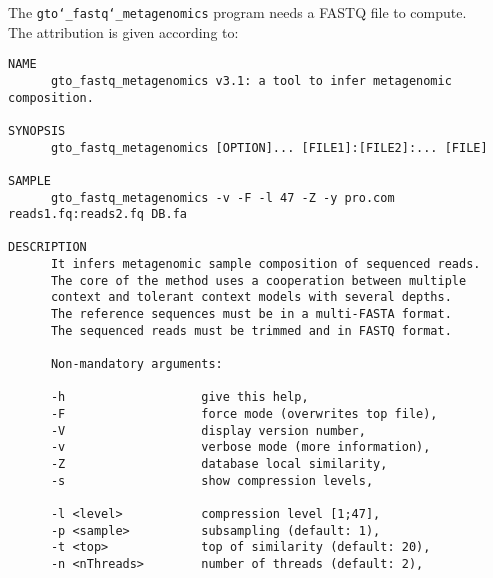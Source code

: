 The \texttt{gto\char`_fastq\char`_metagenomics} program needs a FASTQ file to compute.\\
The attribution is given according to:
\begin{lstlisting}
NAME                                                                     
      gto_fastq_metagenomics v3.1: a tool to infer metagenomic composition.            
                                                                         
SYNOPSIS                                                                 
      gto_fastq_metagenomics [OPTION]... [FILE1]:[FILE2]:... [FILE]                      
                                                                         
SAMPLE                                                                   
      gto_fastq_metagenomics -v -F -l 47 -Z -y pro.com reads1.fq:reads2.fq DB.fa         
                                                                         
DESCRIPTION                                                              
      It infers metagenomic sample composition of sequenced reads.       
      The core of the method uses a cooperation between multiple         
      context and tolerant context models with several depths.           
      The reference sequences must be in a multi-FASTA format.           
      The sequenced reads must be trimmed and in FASTQ format.           
                                                                         
      Non-mandatory arguments:                                           
                                                                         
      -h                   give this help,                               
      -F                   force mode (overwrites top file),             
      -V                   display version number,                       
      -v                   verbose mode (more information),              
      -Z                   database local similarity,                    
      -s                   show compression levels,                      
                                                                         
      -l <level>           compression level [1;47],                    
      -p <sample>          subsampling (default: 1),                    
      -t <top>             top of similarity (default: 20),              
      -n <nThreads>        number of threads (default: 2),              
                                                                         

\end{lstlisting}
